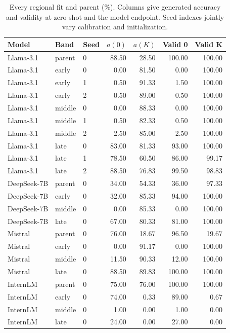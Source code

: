\begin{table}[htbp]\centering\color{blue}\footnotesize
\caption{Every regional fit and parent (\%). Columns give generated accuracy and validity at zero-shot and the model endpoint. Seed indexes jointly vary calibration and initialization.}
\label{stab:regional_detail}
\begin{tabular}{lllrrrr}
\toprule
Model & Band & Seed & $a(0)$ & $a(K)$ & Valid 0 & Valid K \\
\midrule
Llama-3.1 & parent & 0 & 88.50 & 28.50 & 100.00 & 100.00 \\
Llama-3.1 & early & 0 & 0.00 & 81.50 & 0.00 & 100.00 \\
Llama-3.1 & early & 1 & 0.50 & 91.33 & 1.50 & 100.00 \\
Llama-3.1 & early & 2 & 0.50 & 89.00 & 0.50 & 100.00 \\
Llama-3.1 & middle & 0 & 0.00 & 88.33 & 0.00 & 100.00 \\
Llama-3.1 & middle & 1 & 0.50 & 82.33 & 0.50 & 100.00 \\
Llama-3.1 & middle & 2 & 2.50 & 85.00 & 2.50 & 100.00 \\
Llama-3.1 & late & 0 & 83.00 & 81.33 & 93.00 & 100.00 \\
Llama-3.1 & late & 1 & 78.50 & 60.50 & 86.00 & 99.17 \\
Llama-3.1 & late & 2 & 88.50 & 76.83 & 99.50 & 98.83 \\
DeepSeek-7B & parent & 0 & 34.00 & 54.33 & 36.00 & 97.33 \\
DeepSeek-7B & early & 0 & 32.00 & 85.33 & 94.00 & 100.00 \\
DeepSeek-7B & middle & 0 & 0.00 & 85.33 & 0.00 & 100.00 \\
DeepSeek-7B & late & 0 & 67.00 & 80.33 & 81.00 & 100.00 \\
Mistral & parent & 0 & 76.00 & 18.67 & 96.50 & 19.67 \\
Mistral & early & 0 & 0.00 & 91.17 & 0.00 & 100.00 \\
Mistral & middle & 0 & 11.50 & 90.33 & 12.00 & 100.00 \\
Mistral & late & 0 & 88.50 & 89.83 & 100.00 & 100.00 \\
InternLM & parent & 0 & 75.00 & 76.00 & 100.00 & 100.00 \\
InternLM & early & 0 & 74.00 & 0.33 & 89.00 & 0.67 \\
InternLM & middle & 0 & 1.00 & 0.00 & 1.00 & 0.00 \\
InternLM & late & 0 & 24.00 & 0.00 & 27.00 & 0.00 \\
\bottomrule\end{tabular}\end{table}
